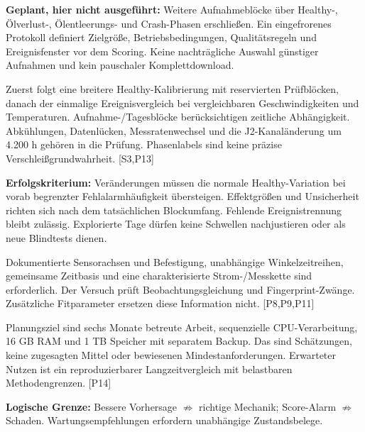 \documentclass[11pt,a4paper]{article}
\newcommand{\src}[1]{{\footnotesize\color{muted}[#1]}}
\begin{document}
\textbf{Geplant, hier nicht ausgeführt:} Weitere Aufnahmeblöcke über Healthy-, Ölverlust-, Ölentleerungs- und Crash-Phasen erschließen. Ein eingefrorenes Protokoll definiert Zielgröße, Betriebsbedingungen, Qualitätsregeln und Ereignisfenster vor dem Scoring. Keine nachträgliche Auswahl günstiger Aufnahmen und kein pauschaler Komplettdownload.

Zuerst folgt eine breitere Healthy-Kalibrierung mit reservierten Prüfblöcken, danach der einmalige Ereignisvergleich bei vergleichbaren Geschwindigkeiten und Temperaturen. Aufnahme-/Tagesblöcke berücksichtigen zeitliche Abhängigkeit. Abkühlungen, Datenlücken, Messratenwechsel und die J2-Kanaländerung um 4.200 h gehören in die Prüfung. Phasenlabels sind keine präzise Verschleißgrundwahrheit. \src{S3,P13}

\textbf{Erfolgskriterium:} Veränderungen müssen die normale Healthy-Variation bei vorab begrenzter Fehlalarmhäufigkeit übersteigen. Effektgrößen und Unsicherheit richten sich nach dem tatsächlichen Blockumfang. Fehlende Ereignistrennung bleibt zulässig. Explorierte Tage dürfen keine Schwellen nachjustieren oder als neue Blindtests dienen.

Dokumentierte Sensorachsen und Befestigung, unabhängige Winkelzeitreihen, gemeinsame Zeitbasis und eine charakterisierte Strom-/Messkette sind erforderlich. Der Versuch prüft Beobachtungsgleichung und Fingerprint-Zwänge. Zusätzliche Fitparameter ersetzen diese Information nicht. \src{P8,P9,P11}

Planungsziel sind sechs Monate betreute Arbeit, sequenzielle CPU-Verarbeitung, 16 GB RAM und 1 TB Speicher mit separatem Backup. Das sind Schätzungen, keine zugesagten Mittel oder bewiesenen Mindestanforderungen. Erwarteter Nutzen ist ein reproduzierbarer Langzeitvergleich mit belastbaren Methodengrenzen. \src{P14}

\textbf{Logische Grenze:} Bessere Vorhersage $\not\Rightarrow$ richtige Mechanik; Score-Alarm $\not\Rightarrow$ Schaden. Wartungsempfehlungen erfordern unabhängige Zustandsbelege.
\end{document}
